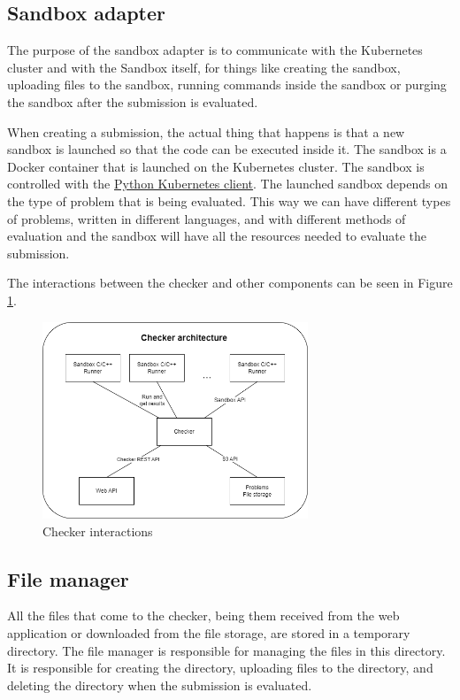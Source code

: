 \documentclass[12pt,a4paper]{report}
\begin{document}
\subsection{Sandbox adapter}
The purpose of the sandbox adapter is to communicate with the Kubernetes cluster and with the Sandbox itself, for things like creating the sandbox, uploading files to the sandbox, running commands inside the sandbox or purging the sandbox after the submission is evaluated.

When creating a submission, the actual thing that happens is that a new sandbox is launched so that the code can be executed inside it. The sandbox is a Docker container that is launched on the Kubernetes cluster. The sandbox is controlled with the \href{https://github.com/kubernetes-client/python}{Python Kubernetes client}. The launched sandbox depends on the type of problem that is being evaluated. This way we can have different types of problems, written in different languages, and with different methods of evaluation and the sandbox will have all the resources needed to evaluate the submission.

The interactions between the checker and other components can be seen in Figure \ref{fig:checker-interactions}.
\begin{figure}[h]
	\centering
	\includegraphics[width=300px]{../photos/checker-architecture.png}
	\caption{Checker interactions}
	\label{fig:checker-interactions}
\end{figure} 


\subsection{File manager}
All the files that come to the checker, being them received from the web application or downloaded from the file storage, are stored in a temporary directory. The file manager is responsible for managing the files in this directory. It is responsible for creating the directory, uploading files to the directory, and deleting the directory when the submission is evaluated.
\end{document}
